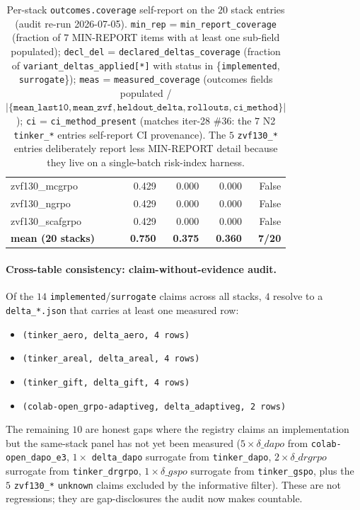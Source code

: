 \documentclass{article}
\begin{document}
\begin{table}[h]
\begin{tabular}{lrrrr}
zvf130\_mcgrpo                      & 0.429 & 0.000 & 0.000 & False \\
zvf130\_ngrpo                       & 0.429 & 0.000 & 0.000 & False \\
zvf130\_scafgrpo                    & 0.429 & 0.000 & 0.000 & False \\
\midrule
\textbf{mean (20 stacks)} & \textbf{0.750} & \textbf{0.375} & \textbf{0.360} & \textbf{7/20} \\
\bottomrule
\end{tabular}
\caption{Per-stack \texttt{outcomes.coverage} self-report on the $20$
stack entries (audit re-run 2026-07-05). \texttt{min\_rep} =
\texttt{min\_report\_coverage} (fraction of $7$ MIN-REPORT items with
at least one sub-field populated); \texttt{decl\_del} =
\texttt{declared\_deltas\_coverage} (fraction of
\texttt{variant\_deltas\_applied[*]} with status in
\{\texttt{implemented}, \texttt{surrogate}\}); \texttt{meas} =
\texttt{measured\_coverage} (outcomes fields populated /
$\lvert\{\texttt{mean\_last10}, \texttt{mean\_zvf}, \texttt{heldout\_delta},
\texttt{rollouts}, \texttt{ci\_method}\}\rvert$); \texttt{ci} =
\texttt{ci\_method\_present} (matches iter-28 \#36: the $7$ N2
\texttt{tinker\_*} entries self-report CI provenance). The $5$
\texttt{zvf130\_*} entries deliberately report less MIN-REPORT
detail because they live on a single-batch risk-index harness.}
\label{tab:p6-outcomes-coverage}
\end{table}

\paragraph{Cross-table consistency: claim-without-evidence audit.}
Of the $14$ \texttt{implemented}/\texttt{surrogate} claims across all
stacks, $4$ resolve to a \texttt{delta\_*.json} that carries at
least one measured row:
\begin{itemize}
  \item \texttt{(tinker\_aero, delta\_aero, 4 rows)}
  \item \texttt{(tinker\_areal, delta\_areal, 4 rows)}
  \item \texttt{(tinker\_gift, delta\_gift, 4 rows)}
  \item \texttt{(colab-open\_grpo-adaptiveg, delta\_adaptiveg, 2 rows)}
\end{itemize}
The remaining $10$ are honest gaps where the registry claims an
implementation but the same-stack panel has not yet been measured
($5\times\delta\_dapo$ from \texttt{colab-open\_dapo\_e3}, $1\times$
\texttt{delta\_dapo} surrogate from \texttt{tinker\_dapo},
$2\times\delta\_drgrpo$ surrogate from \texttt{tinker\_drgrpo},
$1\times\delta\_gspo$ surrogate from \texttt{tinker\_gspo}, plus the
$5$ \texttt{zvf130\_*} \texttt{unknown} claims excluded by the
informative filter). These are not regressions; they are
gap-disclosures the audit now makes countable.
\end{document}
